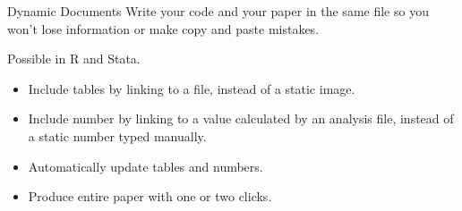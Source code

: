 \documentclass{beamer}
\begin{document}
 { %
    \begin{frame}[plain, label=AEAreg]
     \end{frame}

    \begin{frame}[plain]
     \end{frame}

    \begin{frame}[plain]
     \end{frame}

}


\begin{frame}{Dynamic Documents}
Write your code and your paper in the same file so you won't lose information or make copy and paste mistakes.

Possible in R and Stata.
\begin{itemize}[<.->]
\item Include tables by linking to a file, instead of a static image.
\item Include number by linking to a value calculated by an analysis file, instead of a static number typed manually.
\item Automatically update tables and numbers.
\item Produce entire paper with one or two clicks.
\end{itemize} 
\end{frame}
\end{document}
